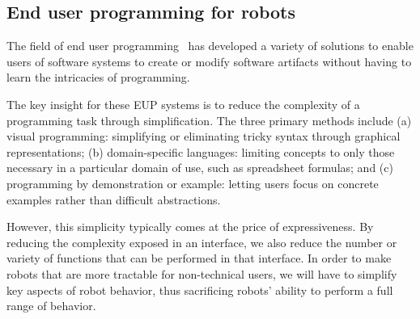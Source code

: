 \documentclass[10pt,twocolumn]{article}
\begin{document}
\begin{changebar}
\section{End user programming for robots}

The field of end user programming~\cite{lieberman-yourwish,dontcheva-nocode} has developed a variety of solutions to enable users of software systems to create or modify software artifacts without having to learn the intricacies of programming.  

The key insight for these EUP systems is to reduce the complexity of a programming task through simplification. The three primary methods include (a) visual programming: simplifying or eliminating tricky syntax through graphical representations; (b) domain-specific languages: limiting concepts to only those necessary in a particular domain of use, such as spreadsheet formulas; and (c) programming by demonstration or example: letting users focus on concrete examples rather than difficult abstractions.

However, this simplicity typically comes at the price of expressiveness. By reducing the complexity exposed in an interface, we also reduce the number or variety of functions that can be performed in that interface. In order to make robots that are more tractable for non-technical users, we will have to simplify key aspects of robot behavior, thus sacrificing robots' ability to perform a full range of behavior.
\end{changebar}


\end{document}
